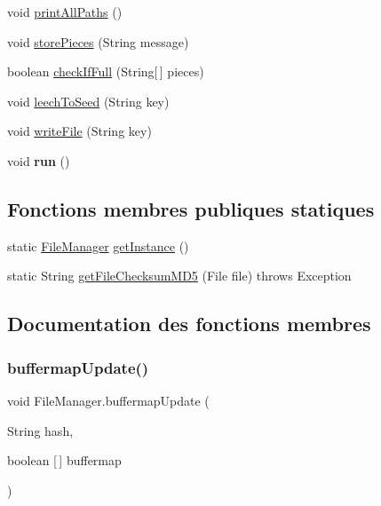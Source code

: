 \begin{DoxyCompactItemize}
void \hyperlink{classFileManager_a4f22816aaf2c5695b0e365eb88c41acf}{print\+All\+Paths} ()
\item 
void \hyperlink{classFileManager_a3612335ed4f691a47636d95dc7620a50}{store\+Pieces} (String message)
\item 
boolean \hyperlink{classFileManager_a5ae706d01456c0b37a47a5ff84a9fa15}{check\+If\+Full} (String\mbox{[}$\,$\mbox{]} pieces)
\item 
void \hyperlink{classFileManager_a98ee226f2fed4c3734eeb15b0518ba59}{leech\+To\+Seed} (String key)
\item 
void \hyperlink{classFileManager_a0715bc52c509e1f0c5011dd1d7a9b76f}{write\+File} (String key)
\item 
\mbox{\label{classFileManager_a20becbe1c1305a1383cf4b58771bd801}} 
void {\bfseries run} ()
\end{DoxyCompactItemize}
\subsection*{Fonctions membres publiques statiques}
\begin{DoxyCompactItemize}
\item 
static \hyperlink{classFileManager}{File\+Manager} \hyperlink{classFileManager_a4b451acca58b1ad1915a855e2f3668f2}{get\+Instance} ()
\item 
static String \hyperlink{classFileManager_adf5dffefb9d9ab0f3e6aab03382375c3}{get\+File\+Checksum\+M\+D5} (File file)  throws Exception 	
\end{DoxyCompactItemize}


\subsection{Documentation des fonctions membres}
\mbox{\label{classFileManager_a4be2735045c292bf7a0e0680bd01b309}} 
\subsubsection{\texorpdfstring{buffermap\+Update()}{buffermapUpdate()}}
{\footnotesize\ttfamily void File\+Manager.\+buffermap\+Update (\begin{DoxyParamCaption}\item[{String}]{hash,  }\item[{boolean \mbox{[}$\,$\mbox{]}}]{buffermap }\end{DoxyParamCaption})\hspace{0.3cm}{\ttfamily [inline]}}

